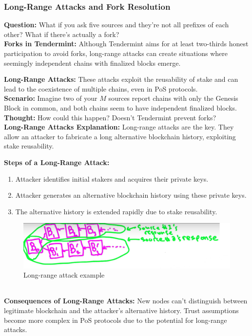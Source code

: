 \subsubsection{Long-Range Attacks and Fork Resolution}

\noindent
\textbf{Question:} What if you ask five sources and they're not all prefixes of each other? What if there's actually a fork?\\

\noindent
\textbf{Forks in Tendermint:} Although Tendermint aims for at least two-thirds honest participation to avoid forks, long-range attacks can create situations where seemingly independent chains with finalized blocks emerge.

\noindent
\textbf{Long-Range Attacks:} These attacks exploit the reusability of stake and can lead to the coexistence of multiple chains, even in PoS protocols.\\

\noindent
\textbf{Scenario:} Imagine two of your $M$ sources report chains with only the Genesis Block in common, and both chains seem to have independent finalized blocks.\\

\noindent
\textbf{Thought:} How could this happen? Doesn't Tendermint prevent forks?\\

\noindent
\textbf{Long-Range Attacks Explanation:} Long-range attacks are the key. They allow an attacker to fabricate a long alternative blockchain history, exploiting stake reusability.

\noindent
\textbf{Steps of a Long-Range Attack:}\begin{enumerate}
    \item Attacker identifies initial stakers and acquires their private keys.
    \item Attacker generates an alternative blockchain history using these private keys.
    \item The alternative history is extended rapidly due to stake reusability.
\end{enumerate}

\begin{figure}[h]
    \centering
    \includegraphics[scale = 0.5]{figures/f57.png}
    \caption{Long-range attack example}
    \label{fig:mesh1}
\end{figure}\\
\noindent
\textbf{Consequences of Long-Range Attacks:}
New nodes can't distinguish between legitimate blockchain and the attacker's alternative history.
Trust assumptions become more complex in PoS protocols due to the potential for long-range attacks.\\

